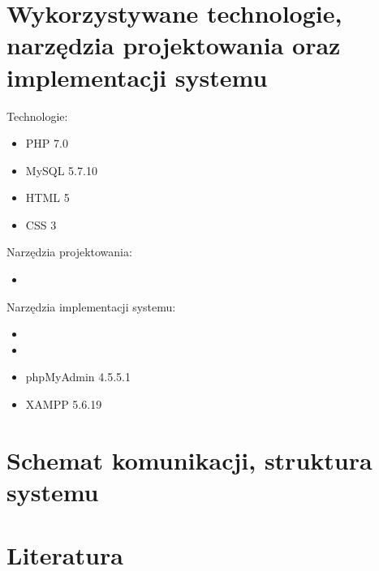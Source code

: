 \documentclass[a4paper, 11pt]{article}
\begin{document}
\section{Wykorzystywane technologie, narzędzia projektowania oraz implementacji systemu}
Technologie:
\begin{itemize}
	\item PHP 7.0
	\item MySQL 5.7.10
	\item HTML 5
	\item CSS 3
\end{itemize}
Narzędzia projektowania:
\begin{itemize}
	\item %
\end{itemize}
Narzędzia implementacji systemu:
\begin{itemize}
	\item %
	\item %
	\item phpMyAdmin 4.5.5.1 %
	\item XAMPP 5.6.19 %
\end{itemize}
\section{Schemat komunikacji, struktura systemu}
\section{Literatura}
\end{document}
